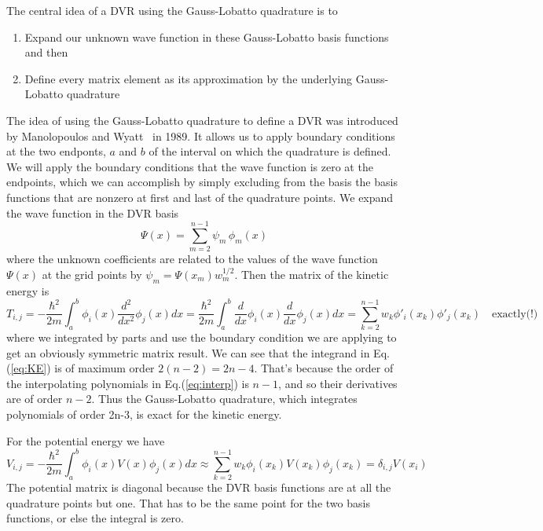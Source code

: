 \documentclass[aps,amssymb,superscriptaddress,floatfix]{revtex4}
\begin{document}
The central idea of a DVR using the Gauss-Lobatto quadrature is to 
\begin{enumerate}
\item{Expand our unknown wave function in these Gauss-Lobatto basis functions and then}
\item{ Define every matrix element as its approximation by the underlying Gauss-Lobatto quadrature }
\end{enumerate}
The idea of using the Gauss-Lobatto quadrature to define a DVR was introduced by Manolopoulos and Wyatt~\cite{Manolopoulos1988,Manolopoulos1989} in 1989.  It allows us to apply boundary conditions at the two endponts, $a$ and $b$ of the interval on which the quadrature is defined.  We will apply the boundary conditions that the wave function is zero at the endpoints, which we can accomplish by simply excluding  from the basis the basis functions that are nonzero at first and last of the quadrature points.  We expand the wave function in the DVR basis
\begin{equation}
\Psi(x) = \sum_{m=2}^{n-1} \psi_m \,  \phi_m(x)
\end{equation}
where the unknown coefficients are related to the values of the wave function $\Psi(x)$ at the grid points by $\psi_m = \Psi(x_m) w_m^{1/2}$.  Then the matrix of the kinetic energy is 
\begin{equation}
T_{i,j} = -\frac{\hbar^2}{2m} \int_a^b \phi_i(x) \frac{d^2}{dx^2} \phi_j(x) dx = \frac{\hbar^2}{2m} \int_a^b \frac{d}{dx}  \phi_i(x) \frac{d}{dx} \phi_j(x) dx =  \sum_{k=2}^{n-1} w_k \phi'_i(x_k) \phi'_j(x_k)  \quad \textrm{exactly(!)}
\label{eq:KE}
\end{equation}
where we integrated by parts and use the boundary condition we are applying to get an obviously symmetric matrix result.  We can see that the integrand in Eq.(\ref{eq:KE})  is of maximum order $2 (n -2) = 2n -4$.  That's because the order of the interpolating polynomials in Eq.(\ref{eq:interp}) is $n-1$, and so their derivatives are of order $n-2$.   Thus the Gauss-Lobatto quadrature, which integrates polynomials of order 2n-3, is exact for the kinetic energy.

For the potential energy we have
\begin{equation}
V_{i,j} = -\frac{\hbar^2}{2m} \int_a^b \phi_i(x) V(x)  \phi_j(x) dx  \approx  \sum_{k=2}^{n-1} w_k \phi_i(x_k) V(x_k) \phi_j(x_k)  
=\delta_{i,j} V(x_i)
\end{equation}
The potential matrix is diagonal because the DVR basis functions are at all the quadrature points but one.  That has to be the same point for the two basis functions, or else the integral is zero.
\end{document}
